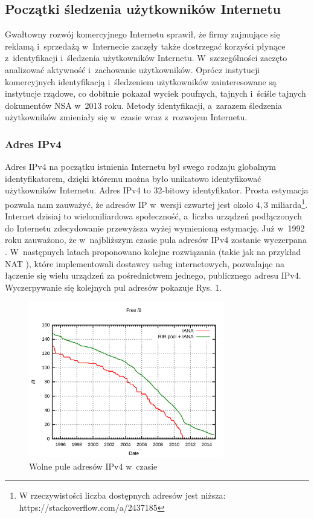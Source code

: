 \subsection{Początki śledzenia użytkowników Internetu}
Gwałtowny rozwój komercyjnego Internetu sprawił, że firmy zajmujące się reklamą
i~sprzedażą w~Internecie zaczęły także dostrzegać korzyści płynące
z~identyfikacji i~śledzenia użytkowników Internetu. W~szczególności zaczęto
analizować aktywność i~zachowanie użytkowników. Oprócz instytucji komercyjnych
identyfikacją i~śledzeniem użytkowników zainteresowane są instytucje rządowe, co
dobitnie pokazał wyciek poufnych, tajnych i~ściśle tajnych dokumentów NSA w~2013
roku. Metody identyfikacji, a~zarazem śledzenia użytkowników zmieniały się
w~czasie wraz z~rozwojem Internetu.

\subsubsection{Adres IPv4}
Adres IPv4 na początku istnienia Internetu był swego rodzaju globalnym
identyfikatorem, dzięki któremu można było unikatowo identyfikować użytkowników
Internetu. Adres IPv4 to 32-bitowy identyfikator. Prosta estymacja pozwala nam
zauważyć, że adresów IP w~wersji czwartej jest około \(4,3\) miliarda\footnote{W
	rzeczywistości liczba dostępnych adresów jest niższa:
https://stackoverflow.com/a/2437185}. Internet dzisiaj to wielomiliardowa
społeczność, a~liczba urządzeń podłączonych do Internetu zdecydowanie przewyższa
wyżej wymienioną estymację. Już w~1992 roku zauważono, że w~najbliższym czasie
pula adresów IPv4 zostanie wyczerpana \cite{fuller1992supernetting}.
W~następnych latach proponowano kolejne rozwiązania (takie jak na przykład NAT
\cite{egevang1994ip}), które implementowali dostawcy usług internetowych,
pozwalając na łączenie się wielu urządzeń za pośrednictwem jednego, publicznego
adresu IPv4. Wyczerpywanie się kolejnych pul adresów pokazuje Rys. 1.

\begin{figure}
	\centering
	\includegraphics[width=0.76\textwidth,keepaspectratio]{img/01}
	\caption{Wolne pule adresów IPv4 w~czasie}
\end{figure}

